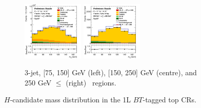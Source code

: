 \begin{figure}[h!]
\begin{subfigure}[b]{\textwidth}
        \includegraphics[width=0.32\textwidth]{Images/VH/Own_fit/postfit_VHcc/Region_distmBB_BMax250_BMin150_DtopCRBC_J3_TTypebt_T1_L1_Y6051_GlobalFit_conditionnal_mu1.png}
        \includegraphics[width=0.32\textwidth]{Images/VH/Own_fit/postfit_VHcc/Region_distmBB_BMax400_BMin250_DtopCRBC_J3_TTypebt_T1_L1_Y6051_GlobalFit_conditionnal_mu1.png}
        \caption{3-jet, [75, 150] GeV (left), [150, 250] GeV (centre), and 250 GeV $\leq$ (right) \ptv\ regions.}
        \label{fig:plots_VHcc_1L_TopCR_3J}
    \end{subfigure}
    \caption{$H$-candidate mass distribution in the 1L $BT$-tagged top CRs.}
    \label{fig:plots_VHcc_1L_TopCR}
\end{figure}
